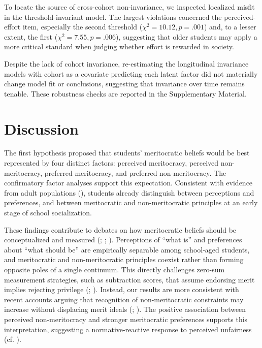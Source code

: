 \documentclass[
  13pt,
]{article}
\begin{document}
To locate the source of cross-cohort non-invariance, we inspected
localized misfit in the threshold-invariant model. The largest
violations concerned the perceived-effort item, especially the second
threshold (\(\chi^2=10.12, p=.001\)) and, to a lesser extent, the first
(\(\chi^2=7.55, p=.006\)), suggesting that older students may apply a
more critical standard when judging whether effort is rewarded in
society.

Despite the lack of cohort invariance, re-estimating the longitudinal
invariance models with cohort as a covariate predicting each latent
factor did not materially change model fit or conclusions, suggesting
that invariance over time remains tenable. These robustness checks are
reported in the Supplementary Material.

\section{Discussion}\label{discussion}

The first hypothesis proposed that students' meritocratic beliefs would
be best represented by four distinct factors: perceived meritocracy,
perceived non-meritocracy, preferred meritocracy, and preferred
non-meritocracy. The confirmatory factor analyses support this
expectation. Consistent with evidence from adult populations
(),
students already distinguish between perceptions and preferences, and
between meritocratic and non-meritocratic principles at an early stage
of school socialization.

These findings contribute to debates on how meritocratic beliefs should
be conceptualized and measured
(;
;
). Perceptions of ``what
is'' and preferences about ``what should be'' are empirically separable
among school-aged students, and meritocratic and non-meritocratic
principles coexist rather than forming opposite poles of a single
continuum. This directly challenges zero-sum measurement strategies,
such as subtraction scores, that assume endorsing merit implies
rejecting privilege (; ). Instead, our results are more consistent with recent accounts
arguing that recognition of non-meritocratic constraints may increase
without displacing merit ideals (; ).
The positive association between perceived non-meritocracy and stronger
meritocratic preferences supports this interpretation, suggesting a
normative-reactive response to perceived unfairness (cf.
).
\end{document}
